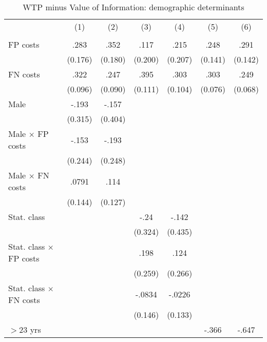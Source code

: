 \begin{table}[htbp]\centering
\caption{WTP minus Value of Information: demographic determinants}
\begin{tabular}{l*{6}{c}}
\hline\hline
                &\multicolumn{1}{c}{(1)}&\multicolumn{1}{c}{(2)}&\multicolumn{1}{c}{(3)}&\multicolumn{1}{c}{(4)}&\multicolumn{1}{c}{(5)}&\multicolumn{1}{c}{(6)}\\
                &\multicolumn{1}{c}{}&\multicolumn{1}{c}{}&\multicolumn{1}{c}{}&\multicolumn{1}{c}{}&\multicolumn{1}{c}{}&\multicolumn{1}{c}{}\\
\hline
FP costs        &     .283&     .352&     .117&     .215&     .248&     .291\\
                &  (0.176)&  (0.180)&  (0.200)&  (0.207)&  (0.141)&  (0.142)\\
FN costs        &     .322&     .247&     .395&     .303&     .303&     .249\\
                &  (0.096)&  (0.090)&  (0.111)&  (0.104)&  (0.076)&  (0.068)\\
Male            &    -.193&    -.157&         &         &         &         \\
                &  (0.315)&  (0.404)&         &         &         &         \\
Male $\times$ FP costs&    -.153&    -.193&         &         &         &         \\
                &  (0.244)&  (0.248)&         &         &         &         \\
Male $\times$ FN costs&    .0791&     .114&         &         &         &         \\
                &  (0.144)&  (0.127)&         &         &         &         \\
Stat. class     &         &         &     -.24&    -.142&         &         \\
                &         &         &  (0.324)&  (0.435)&         &         \\
Stat. class $\times$ FP costs&         &         &     .198&     .124&         &         \\
                &         &         &  (0.259)&  (0.266)&         &         \\
Stat. class $\times$ FN costs&         &         &   -.0834&   -.0226&         &         \\
                &         &         &  (0.146)&  (0.133)&         &         \\
$>$23 yrs       &         &         &         &         &    -.366&    -.647\\

\end{tabular}
\end{table}
